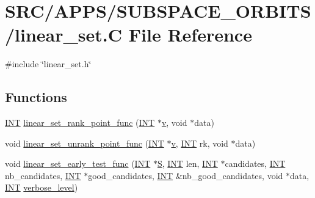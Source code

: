 \hypertarget{linear__set_8_c}{}\section{S\+R\+C/\+A\+P\+P\+S/\+S\+U\+B\+S\+P\+A\+C\+E\+\_\+\+O\+R\+B\+I\+T\+S/linear\+\_\+set.C File Reference}
\label{linear__set_8_c}
{\ttfamily \#include \char`\"{}linear\+\_\+set.\+h\char`\"{}}\newline
\subsection*{Functions}
\begin{DoxyCompactItemize}
\item 
\mbox{\hyperlink{galois_8h_a09fddde158a3a20bd2dcadb609de11dc}{I\+NT}} \mbox{\hyperlink{linear__set_8_c_aa42403726dcde3a558a8c89a3c34d63e}{linear\+\_\+set\+\_\+rank\+\_\+point\+\_\+func}} (\mbox{\hyperlink{galois_8h_a09fddde158a3a20bd2dcadb609de11dc}{I\+NT}} $\ast$\mbox{\hyperlink{simeon_8_c_aeb3f3030944801b163bc3b829a7f6710}{v}}, void $\ast$data)
\item 
void \mbox{\hyperlink{linear__set_8_c_a9a338c17af08272ac682ffa2aa90299b}{linear\+\_\+set\+\_\+unrank\+\_\+point\+\_\+func}} (\mbox{\hyperlink{galois_8h_a09fddde158a3a20bd2dcadb609de11dc}{I\+NT}} $\ast$\mbox{\hyperlink{simeon_8_c_aeb3f3030944801b163bc3b829a7f6710}{v}}, \mbox{\hyperlink{galois_8h_a09fddde158a3a20bd2dcadb609de11dc}{I\+NT}} rk, void $\ast$data)
\item 
void \mbox{\hyperlink{linear__set_8_c_a1ef4e3af78068bd4c49bf7d1509cf936}{linear\+\_\+set\+\_\+early\+\_\+test\+\_\+func}} (\mbox{\hyperlink{galois_8h_a09fddde158a3a20bd2dcadb609de11dc}{I\+NT}} $\ast$\mbox{\hyperlink{simeon_8_c_adab47f8243f1b5a2c31df2535d6b37d0}{S}}, \mbox{\hyperlink{galois_8h_a09fddde158a3a20bd2dcadb609de11dc}{I\+NT}} len, \mbox{\hyperlink{galois_8h_a09fddde158a3a20bd2dcadb609de11dc}{I\+NT}} $\ast$candidates, \mbox{\hyperlink{galois_8h_a09fddde158a3a20bd2dcadb609de11dc}{I\+NT}} nb\+\_\+candidates, \mbox{\hyperlink{galois_8h_a09fddde158a3a20bd2dcadb609de11dc}{I\+NT}} $\ast$good\+\_\+candidates, \mbox{\hyperlink{galois_8h_a09fddde158a3a20bd2dcadb609de11dc}{I\+NT}} \&nb\+\_\+good\+\_\+candidates, void $\ast$data, \mbox{\hyperlink{galois_8h_a09fddde158a3a20bd2dcadb609de11dc}{I\+NT}} \mbox{\hyperlink{simeon_8_c_a818073fbcc2f439e7c56952f67386122}{verbose\+\_\+level}})

\end{DoxyCompactItemize}
